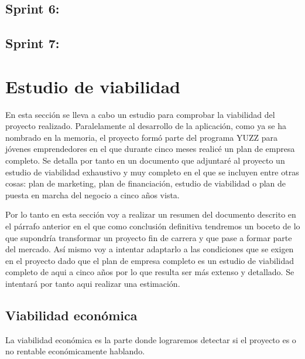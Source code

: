 \subsection{Sprint 6: }\label{sprint6}

\subsection{Sprint 7: }\label{sprint6}


\section{Estudio de viabilidad}\label{estudio-viabilidad}
En esta sección se lleva a cabo un estudio para comprobar la viabilidad del proyecto realizado. Paralelamente al desarrollo de la aplicación, como ya se ha nombrado en la memoria, el proyecto formó parte del programa YUZZ para jóvenes emprendedores en el que durante cinco meses realicé un plan de empresa completo. Se detalla por tanto en un documento que adjuntaré al proyecto un estudio de viabilidad exhaustivo  y muy completo en el que se incluyen entre otras cosas: plan de marketing, plan de financiación, estudio de viabilidad o plan de puesta en marcha del negocio a cinco años vista. 

Por lo tanto en esta sección voy a realizar un resumen del documento descrito en el párrafo anterior en el que como conclusión definitiva tendremos un boceto de lo que supondría transformar un proyecto fin de carrera y que pase a formar parte del mercado. Así mismo voy a intentar adaptarlo a las condiciones que se exigen en el proyecto dado que el plan de empresa completo es un estudio de viabilidad completo de aqui a cinco años por lo que resulta ser más extenso y detallado. Se intentará por tanto aqui realizar una estimación.

\subsection{Viabilidad económica}\label{viabilidad-economica}

La viabilidad económica es la parte donde lograremos detectar si el proyecto es o no rentable económicamente hablando.

